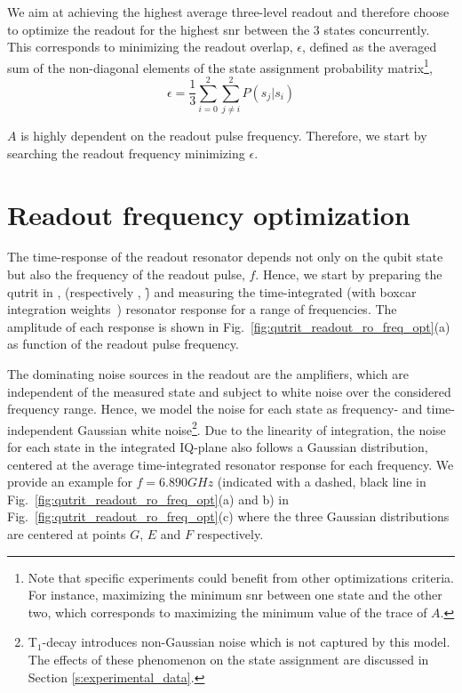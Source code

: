 We aim at achieving the highest average three-level readout and therefore choose to optimize the readout for the highest \gls{snr} between the 3 states concurrently. This corresponds to minimizing the readout overlap, $\epsilon$, defined as the averaged sum of the non-diagonal elements of the state assignment probability matrix\footnote{Note that specific experiments could benefit from other optimizations criteria. For instance, maximizing the minimum \gls{snr} between one state and the other two, which corresponds to maximizing the minimum value of the trace of $A$.},
\begin{equation} \label{eq:qutrit_readout_overlap}
    \epsilon = \frac{1}{3}\sum_{i=0}^{2}{\sum_{j \neq i}^{2}{P(s_j | s_i)}}
\end{equation}

$A$ is highly dependent on the readout pulse frequency. Therefore, we start by searching the readout frequency minimizing $\epsilon$.

\section{Readout frequency optimization} \label{s:frequency_optimization}
The time-response of the readout resonator depends not only on the qubit state but also the frequency of the readout pulse, $f$. Hence, we start by preparing the qutrit in \g, (respectively \e, \f) and measuring the time-integrated (with boxcar integration weights~\cite{Gambetta2007}) resonator response for a range of frequencies. The amplitude of each response is shown in Fig.~\ref{fig:qutrit_readout_ro_freq_opt}(a) as function of the readout pulse frequency.

The dominating noise sources in the readout are the amplifiers, which are independent of the measured state and subject to white noise over the considered frequency range. Hence, we model the noise for each state as frequency- and time-independent Gaussian white noise\footnote{T$_1$-decay introduces non-Gaussian noise which is not captured by this model. The effects of these phenomenon on the state assignment are discussed in Section \ref{s:experimental_data}.}. Due to the linearity of integration, the noise for each state in the integrated IQ-plane also follows a Gaussian distribution, centered at the average time-integrated resonator response for each frequency. We provide an example for $f = 6.890\unit{GHz}$ (indicated with a dashed, black line in Fig.~\ref{fig:qutrit_readout_ro_freq_opt}(a) and b) in Fig.~\ref{fig:qutrit_readout_ro_freq_opt}(c) where the three Gaussian distributions are centered at points $G$, $E$ and $F$ respectively.

